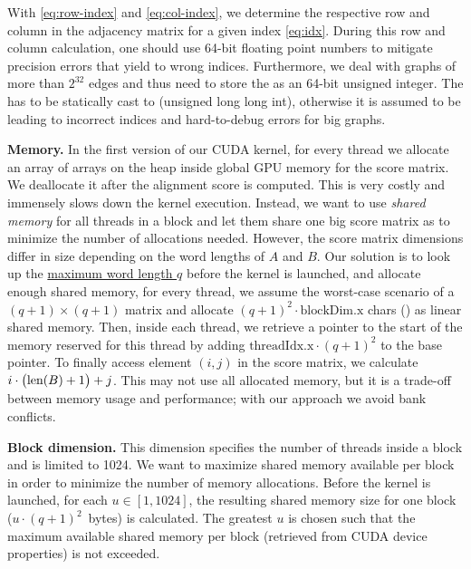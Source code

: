 With \eqref{eq:row-index} and \eqref{eq:col-index}, we determine the respective row and column in the adjacency matrix for a given index \eqref{eq:idx}. During this row and column calculation, one should use 64-bit floating point numbers to mitigate precision errors that yield to wrong indices. Furthermore, we deal with graphs of more than $2^{32}$ edges and thus need to store the  as an 64-bit unsigned integer. The  has to be statically cast to  (unsigned long long int), otherwise it is assumed to be  leading to incorrect indices and hard-to-debug errors for big graphs.


\textbf{Memory.} In the first version of our CUDA kernel, for every thread we allocate an array of arrays on the heap inside global GPU memory for the score matrix.  We deallocate it after the alignment score is computed. This is very costly and immensely slows down the kernel execution. Instead, we want to use \textit{shared memory} for all threads in a block and let them share one big score matrix as to minimize the number of allocations needed. However, the score matrix dimensions differ in size depending on the word lengths of $A$ and $B$. Our solution is to look up the \underline{maximum word length $q$} before the kernel is launched, and allocate enough shared memory, \ie for every thread, we assume the worst-case scenario of a $(q+1)\times(q+1)$ matrix and allocate $(q+1)^2 \cdot \text{blockDim.x}$ chars () as linear shared memory. Then, inside each thread, we retrieve a pointer to the start of the memory reserved for this thread by adding $\text{threadIdx.x} \cdot (q+1)^2$ to the base pointer. To finally access element $(i,j)$ in the score matrix, we calculate $i\cdot \bigl(\text{len}(B) + 1\bigr) + j$. This may not use all allocated memory, but it is a trade-off between memory usage and performance; with our approach we avoid bank conflicts.


\textbf{Block dimension.} This dimension specifies the number of threads inside a block and is limited to 1024. We want to maximize shared memory available per block in order to minimize the number of memory allocations. Before the kernel is launched, for each $u\in [1,1024]$, the resulting shared memory size for one block ($u\cdot (q+1)^2$~bytes) is calculated. The greatest $u$ is chosen such that the maximum available shared memory per block (retrieved from CUDA device properties) is not exceeded.
